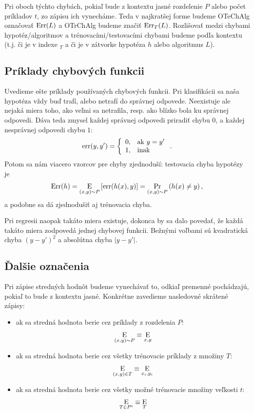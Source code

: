 Pri oboch týchto chybách, pokiaľ bude z kontextu jasné rozdelenie $P$
alebo počet príkladov $t$, zo zápisu ich vynecháme. Teda v najkratšej
forme budeme OTeChAlg označovať $\mathrm{Err}(L)$ a OTrChAlg budeme značiť
$\mathrm{Err}_T(L)$. Rozlišovať medzi chybami hypotéz/algoritmov
a trénovacími/testovacími chybami budeme podľa kontextu (t.j. či je
v indexe $_T$ a či je v zátvorke hypotéza $h$ alebo algoritmus $L$).



\subsection{Príklady chybových funkcii}

Uvedieme ešte príklady používaných chybových funkcii.
Pri klasifikácii sa naša hypotéza vždy buď trafí, alebo netrafí do
správnej odpovede. Neexistuje ale nejaká miera toho, ako veľmi sa netrafila,
resp. ako blízko bola ku správnej odpovedi. Dáva teda zmysel každej správnej
odpovedi priradiť chybu $0$, a každej nesprávnej odpovedi chybu $1$:
$$
  \mathrm{err}(y, y') = \left\{
    \begin{array}{ll}
      0, & \text{ak}\ y = y' \\
      1, & \text{inak}
    \end{array}
  \right.
  .
$$
Potom sa nám viacero vzorcov pre chyby zjednoduší: testovacia chyba
hypotézy je
$$\mathrm{Err}(h) = \operatorname*{\mathrm{E}}_{(x, y) \sim P} \left[ \mathrm{err}(h(x), y) \right] = \operatorname*{\mathrm{Pr}}_{(x, y) \sim P} \left( h(x) \neq y \right),$$
a podobne sa dá zjednodušiť aj trénovacia chyba.

Pri regresii naopak takáto miera existuje, dokonca by sa dalo povedať, že
každá takáto miera zodpovedá jednej chybovej funkcii. Bežnými voľbami sú
kvadratická chyba $(y - y')^2$ a absolútna chyba $|y - y'|$.



\subsection{Ďalšie označenia}

Pri zápise stredných hodnôt budeme vynechávať to, odkiaľ premenné pochádzajú,
pokiaľ to bude z kontextu jasné. Konkrétne zavedieme nasledovné skrátené
zápisy:

\begin{itemize}
  \item ak sa stredná hodnota berie cez príklady z rozdelenia $P$:
    $$ \operatorname*{\mathrm{E}}_{(x, y) \sim P} \equiv \operatorname*{\mathrm{E}}_{x, y} $$
  \item ak sa stredná hodnota berie cez všetky trénovacie príklady
    z množiny $T$:
    $$ \operatorname*{\mathrm{E}}_{(x, y) \in T} \equiv \operatorname*{\mathrm{E}}_{x_i, y_i} $$
  \item ak sa stredná hodnota berie cez všetky možné trénovacie
    množiny veľkosti $t$:
    $$ \operatorname*{\mathrm{E}}_{T \in P^t} \equiv \operatorname*{\mathrm{E}}_T $$
\end{itemize}

